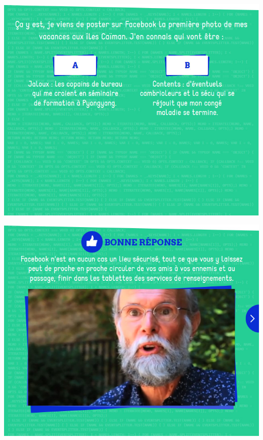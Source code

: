 \documentclass{beamer}
\begin{document}
\begin{frame}\includegraphics[scale=0.6] {./images/Quizz_HygieneNumerique_France4_34.jpg} \end{frame}
\begin{frame}\includegraphics[scale=0.6] {./images/Quizz_HygieneNumerique_France4_35.jpg} \end{frame}
\end{document}

